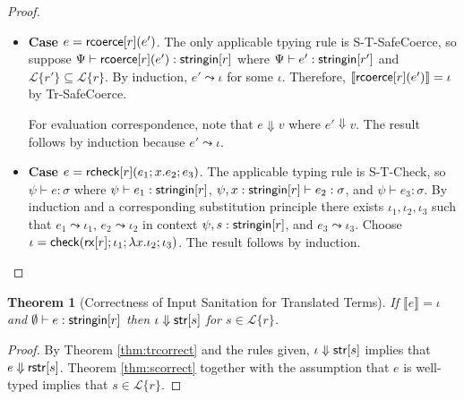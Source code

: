 \documentclass[11pt,leqno]{article}
\newtheorem{thm}{Theorem}
\theoremstyle{definition}
\newcommand{\Lagr}{\mathcal{L}}
\newcommand{\lang}[1]{\Lagr\{#1\}}
\newcommand{\coerce}[2]{ {\sf rcoerce}[#1](#2)}
\newcommand{\rcoerce}[2]{{\sf rcoerce}[#1](#2)}
\newcommand{\sistr}[1]{{\sf rstr}[#1]}   \newcommand{\rstr}[1]{{\sf rstr}[#1]} %
\newcommand{\rcheck}[4]{ {\sf rcheck}[#1](#2;#3;#4) }
\newcommand{\strin}[1]{\sistr{#1}}
\newcommand{\stringin}[1]{{\sf stringin}[#1]}
\newcommand{\tcheck}[4]{{\sf check}(#1; #2; #3; #4)}
\renewcommand{\tstr}[1]{{{\sf str}[#1]}}
\newcommand{\rx}[1]{ {\sf rx}[#1] }
\newcommand{\sctx}{\Psi} %
\newcommand{\trden}[1]{\llbracket #1 \rrbracket} %
\newcommand{\sreduces}{ \Downarrow }
\begin{document}
\begin{proof}
\begin{itemize}[label=$ $, itemsep=1ex]
\item \textbf{Case $e = \rcoerce{r}{e'}$}.
The only applicable tpying rule is S-T-SafeCoerce, so suppose
$\sctx \vdash \rcoerce{r}{e'} : \stringin{r}$ where
$\sctx \vdash e' : \stringin{r'}$ and $\lang{r'} \subseteq \lang{r}$.
By induction, $e' \leadsto \iota$ for some $\iota$.
Therefore, $\trden{\coerce{r}{e'}} = \iota$ by Tr-SafeCoerce.

For evaluation correspondence, note that $e \sreduces v$ where
$e' \sreduces v$. The result follows by induction because $e' \leadsto \iota$. 

\item \textbf{Case $e = \rcheck{r}{e_1}{x.e_2}{e_3}$}.
The applicable typing rule is S-T-Check,
so $\psi \vdash e : \sigma$ where 
$\psi \vdash e_1 : \stringin{r}$,
$\psi, x : \stringin{r} \vdash e_2 : \sigma$,
and $\psi \vdash e_3 : \sigma$.
By induction and a corresponding substitution principle there exists $\iota_1, \iota_2, \iota_3$ such that
$e_1 \leadsto \iota_1$, 
$e_2 \leadsto \iota_2$ in context $\psi, s : \stringin{r}$, and
$e_3 \leadsto \iota_3$.
Choose $\iota = \tcheck{\rx{r}}{\iota_1}{\lambda x . \iota_2}{\iota_3}$.
 The result follows by induction.

\end{itemize}
\end{proof}

\begin{thm}[Correctness of Input Sanitation for Translated Terms]\label{thm:main}
  If $\trden{e} = \iota$ and $\emptyset \vdash e : \stringin{r}$ then $\iota \sreduces \tstr{s}$
  for $s \in \lang{r}$.
\end{thm}
\begin{proof}
  By Theorem \ref{thm:trcorrect} and the rules given, $\iota \sreduces \tstr{s}$ implies that $e \sreduces \strin{s}$.
  Theorem \ref{thm:scorrect} together with the assumption that $e$ is well-typed implies that $s \in \lang{r}$.
\end{proof}

\end{document}
